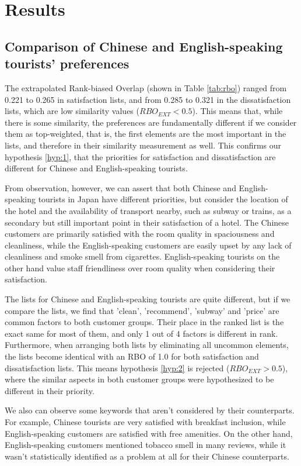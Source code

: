 \section{Results}\label{results}

\subsection{Comparison of Chinese and English-speaking tourists' preferences}

The extrapolated Rank-biased Overlap (shown in Table \ref{tab:rbo}) ranged from 0.221 to 0.265 in satisfaction lists, and from 0.285 to 0.321 in the dissatisfaction lists, which are low similarity values (\(RBO_{EXT} < 0.5\)). This means that, while there is some similarity, the preferences are fundamentally different if we consider them as top-weighted, that is, the first elements are the most important in the lists, and therefore in their similarity measurement as well. This confirms our hypothesis \ref{hyp:1}, that the priorities for satisfaction and dissatisfaction are different for Chinese and English-speaking tourists. 

From observation, however, we can assert that both Chinese and English-speaking tourists in Japan have different priorities, but consider the location of the hotel and the availability of transport nearby, such as subway or trains, as a secondary but still important point in their satisfaction of a hotel. The Chinese customers are primarily satisfied with the room quality in spaciousness and cleanliness, while the English-speaking customers are easily upset by any lack of cleanliness and smoke smell from cigarettes. English-speaking tourists on the other hand value staff friendliness over room quality when considering their satisfaction. 

The lists for Chinese and English-speaking tourists are quite different, but if we compare the lists, we find that 'clean', 'recommend', 'subway' and 'price' are common factors to both customer groups. Their place in the ranked list is the exact same for most of them, and only 1 out of 4 factors is different in rank. Furthermore, when arranging both lists by eliminating all uncommon elements, the lists become identical with an RBO of 1.0 for both satisfaction and dissatisfaction lists. This means hypothesis \ref{hyp:2} is rejected (\(RBO_{EXT} > 0.5\)), where the similar aspects in both customer groups were hypothesized to be different in their priority.

We also can observe some keywords that aren't considered by their counterparts. For example, Chinese tourists are very satisfied with breakfast inclusion, while English-speaking customers are satisfied with free amenities. On the other hand, English-speaking customers mentioned tobacco smell in many reviews, while it wasn't statistically identified as a problem at all for their Chinese counterparts.


